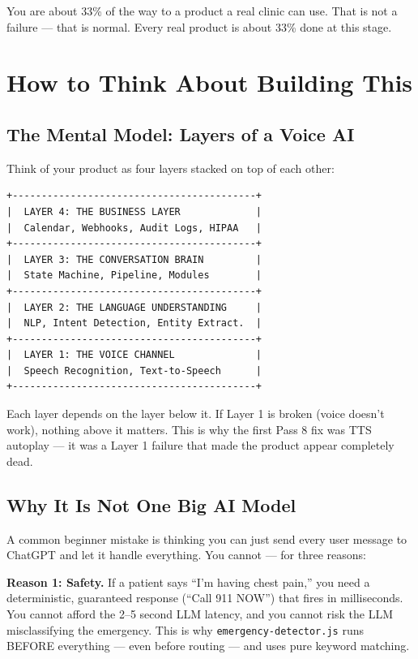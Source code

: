 \documentclass[12pt, a4paper]{report}
\newcommand{\ic}[1]{\texttt{\small\color{accentblue!70!black}#1}}
\begin{document}
\begin{infobox}
  You are about 33\% of the way to a product a real clinic can use. That is not a
  failure --- that is normal. Every real product is about 33\% done at this stage.
\end{infobox}

\chapter{How to Think About Building This}

\section{The Mental Model: Layers of a Voice AI}

Think of your product as four layers stacked on top of each other:

\begin{lstlisting}
+------------------------------------------+
|  LAYER 4: THE BUSINESS LAYER             |
|  Calendar, Webhooks, Audit Logs, HIPAA   |
+------------------------------------------+
|  LAYER 3: THE CONVERSATION BRAIN         |
|  State Machine, Pipeline, Modules        |
+------------------------------------------+
|  LAYER 2: THE LANGUAGE UNDERSTANDING     |
|  NLP, Intent Detection, Entity Extract.  |
+------------------------------------------+
|  LAYER 1: THE VOICE CHANNEL              |
|  Speech Recognition, Text-to-Speech      |
+------------------------------------------+
\end{lstlisting}

Each layer depends on the layer below it. If Layer 1 is broken (voice doesn't work),
nothing above it matters. This is why the first Pass 8 fix was TTS autoplay --- it was a
Layer 1 failure that made the product appear completely dead.

\section{Why It Is Not One Big AI Model}

A common beginner mistake is thinking you can just send every user message to ChatGPT
and let it handle everything. You cannot --- for three reasons:

\textbf{Reason 1: Safety.} If a patient says ``I'm having chest pain,'' you need a
deterministic, guaranteed response (``Call 911 NOW'') that fires in milliseconds. You
cannot afford the 2--5 second LLM latency, and you cannot risk the LLM misclassifying
the emergency. This is why \ic{emergency-detector.js} runs BEFORE everything --- even
before routing --- and uses pure keyword matching.
\end{document}
